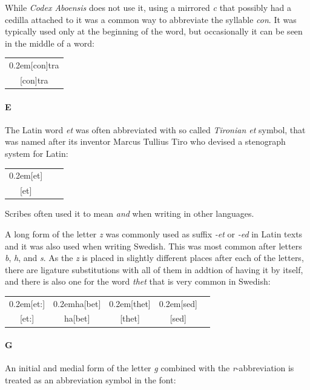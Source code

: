 \documentclass[a4paper]{article}
\newcommand{\samplefont}{\fontsize{16}{16}\abcursivefamily\spaceskip0.2em}
\newcommand{\sample}[1]{{\samplefont #1 \strut}}
\begin{document}
While \emph{Codex Aboensis} does not use it, using a mirrored \emph{c}
that possibly had a cedilla attached to it was a common way to
abbreviate the syllable \emph{con}. It was typically used only at the
beginning of the word, but occasionally it can be seen in the middle
of a word:
\begin{center}
  \begin{tabular}{c}
    \sample{[con]tra} \\
    {}[con]tra
  \end{tabular}
\end{center}

\paragraph{E}

The Latin word \emph{et} was often abbreviated with so called
\emph{Tironian et} symbol, that was named after its inventor Marcus
Tullius Tiro who devised a stenograph system for Latin:
\begin{center}
  \begin{tabular}{ccc}
    \sample{[et]} \\
    {}[et]
  \end{tabular}
\end{center}
Scribes often used it to mean \emph{and} when writing in other
languages.

A long form of the letter \emph{z} was commonly used as suffix
\emph{-et} or \emph{-ed} in Latin texts and it was also used when
writing Swedish. This was most common after letters \emph{b},
\emph{h}, and \emph{s}. As the \emph{z} is placed in slightly
different places after each of the letters, there are ligature
substitutions with all of them in addtion of having it by itself, and
there is also one for the word \emph{thet} that is very common in
Swedish:
\begin{center}
  \begin{tabular}{ccccc}
    \sample{[et:]} & \sample{ha[bet]} & \sample{[thet]} &
      \sample{[sed]} \\
     {}[et:] & ha[bet] & [thet] & [sed] \\
  \end{tabular}
\end{center}


\paragraph{G}

An initial and medial form of the letter \emph{g} combined with the
\emph{r}-abbreviation is treated as an abbreviation symbol in the
font:
\end{document}
